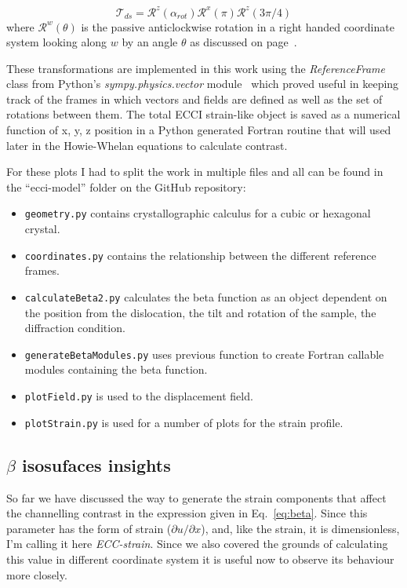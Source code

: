 \begin{equation}
    \mathcal{T}_{ds} = \mathcal{R}^z(\alpha_{rot}) \mathcal{R}^x(\pi) \mathcal{R}^z(3\pi/4)
\end{equation}
where $\mathcal{R}^w(\theta)$ is the passive anticlockwise rotation in a right handed coordinate system looking along $w$ by an angle $\theta$ as discussed on page~\pageref{subchap:basicRot}.

These transformations are implemented in this work using the \textit{ReferenceFrame} class from Python's
\textit{sympy.physics.vector} module~\cite{sympy} which proved useful in keeping track of the frames in which vectors and fields
are defined as well as the set of rotations between them. The total ECCI strain-like object is saved as a numerical
function of x, y, z position in a Python generated Fortran routine that will used later in the Howie-Whelan equations to calculate contrast. 

For these plots I had to split the work in multiple files and all can be found in the ``ecci-model'' folder on the GitHub repository: 
\begin{itemize}
    \item \texttt{geometry.py} contains crystallographic calculus for a cubic or hexagonal crystal.
    \item \texttt{coordinates.py} contains the relationship between the different reference frames.
    \item \texttt{calculateBeta2.py} calculates the beta function as an object dependent on the position from the dislocation, the tilt and rotation of the sample, the diffraction condition.
    \item \texttt{generateBetaModules.py} uses previous function to create Fortran callable modules containing the beta function.
    \item \texttt{plotField.py} is used to the displacement field.
    \item \texttt{plotStrain.py} is used for a number of plots for the strain profile.
\end{itemize}



\subsection{\texorpdfstring{$\beta$}{beta} isosufaces insights}
\label{sec:betacomparisons}
So far we have discussed the way to generate the strain components that affect the channelling contrast in the expression given in Eq.~\ref{eq:beta}. Since this parameter has the form of strain ($\partial u/ \partial x$), and, like the strain, it is dimensionless, I'm calling it here \textit{ECC-strain}. Since we also covered the grounds of calculating this value in different coordinate system it is useful now to observe its behaviour more closely.

